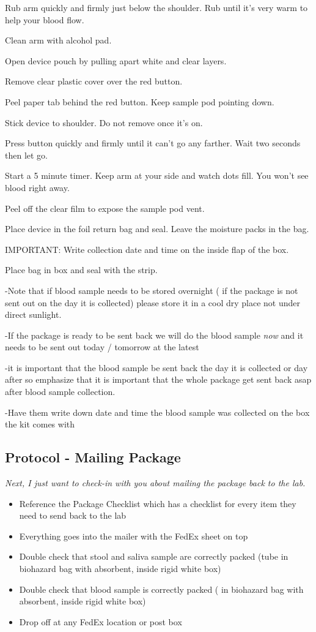 \documentclass[]{book}
\begin{document}
Rub arm quickly and firmly just below the shoulder. Rub until it's very warm to help your blood flow.

Clean arm with alcohol pad.

Open device pouch by pulling apart white and clear layers.

Remove clear plastic cover over the red button.

Peel paper tab behind the red button. Keep sample pod pointing down.

Stick device to shoulder. Do not remove once it's on.

Press button quickly and firmly until it can't go any farther. Wait two seconds then let go.

Start a 5 minute timer. Keep arm at your side and watch dots fill. You won't see blood right away.

Peel off the clear film to expose the sample pod vent.

Place device in the foil return bag and seal. Leave the moisture packs in the bag.

IMPORTANT: Write collection date and time on the inside flap of the box.

Place bag in box and seal with the strip.

-Note that if blood sample needs to be stored overnight ( if the package is not sent out on the day it is collected) please store it in a cool dry place not under direct sunlight.

-If the package is ready to be sent back we will do the blood sample \emph{now} and it needs to be sent out today / tomorrow at the latest

-it is important that the blood sample be sent back the day it is collected or day after so emphasize that it is important that the whole package get sent back asap after blood sample collection.

-Have them write down date and time the blood sample was collected on the box the kit comes with

\hypertarget{protocol---mailing-package-1}{%
\subsection{Protocol - Mailing Package}\label{protocol---mailing-package-1}}

\emph{Next, I just want to check-in with you about mailing the package back to the lab.}

\begin{itemize}
\item
  Reference the Package Checklist which has a checklist for every item they need to send back to the lab
\item
  Everything goes into the mailer with the FedEx sheet on top
\item
  Double check that stool and saliva sample are correctly packed (tube in biohazard bag with absorbent, inside rigid white box)
\item
  Double check that blood sample is correctly packed ( in biohazard bag with absorbent, inside rigid white box)
\item
  Drop off at any FedEx location or post box
\end{itemize}
\end{document}
